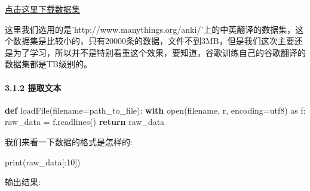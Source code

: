 \documentclass[
]{article}
\newenvironment{Shaded}{}{}
\newcommand{\BuiltInTok}[1]{#1}
\newcommand{\ControlFlowTok}[1]{\textcolor[rgb]{0.00,0.44,0.13}{\textbf{#1}}}
\newcommand{\DecValTok}[1]{\textcolor[rgb]{0.25,0.63,0.44}{#1}}
\newcommand{\ImportTok}[1]{#1}
\newcommand{\KeywordTok}[1]{\textcolor[rgb]{0.00,0.44,0.13}{\textbf{#1}}}
\newcommand{\NormalTok}[1]{#1}
\newcommand{\OperatorTok}[1]{\textcolor[rgb]{0.40,0.40,0.40}{#1}}
\newcommand{\StringTok}[1]{\textcolor[rgb]{0.25,0.44,0.63}{#1}}
\begin{document}
\href{http://www.manythings.org/anki/cmn-eng.zip}{点击这里下载数据集}

这里我们选用的是'http://www.manythings.org/anki/'上的中英翻译的数据集，这个数据集是比较小的，只有20000条的数据，文件不到3MB，但是我们这次主要还是为了学习，所以并不是特别看重这个效果，要知道，谷歌训练自己的谷歌翻译的数据集都是TB级别的。

\hypertarget{header-n88}{%
\paragraph{3.1.2 提取文本}\label{header-n88}}

\begin{Shaded}
\begin{Highlighting}[]
\KeywordTok{def}\NormalTok{ loadFile(filename}\OperatorTok{=}\NormalTok{path\_to\_file):}
    \ControlFlowTok{with} \BuiltInTok{open}\NormalTok{(filename, }\StringTok{\textquotesingle{}r\textquotesingle{}}\NormalTok{, encoding}\OperatorTok{=}\StringTok{\textquotesingle{}utf8\textquotesingle{}}\NormalTok{) }\ImportTok{as}\NormalTok{ f:}
\NormalTok{        raw\_data }\OperatorTok{=}\NormalTok{ f.readlines()}
    \ControlFlowTok{return}\NormalTok{ raw\_data}
\end{Highlighting}
\end{Shaded}

我们来看一下数据的格式是怎样的:

\begin{Shaded}
\begin{Highlighting}[]
\BuiltInTok{print}\NormalTok{(raw\_data[:}\DecValTok{10}\NormalTok{])}
\end{Highlighting}
\end{Shaded}

输出结果:
\end{document}
